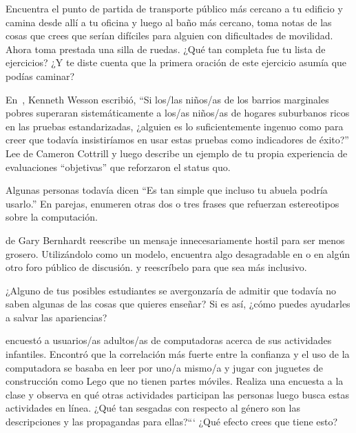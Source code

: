 
Encuentra el punto de partida de transporte público más cercano a tu edificio
y camina desde allí a tu oficina y luego al baño más cercano,
toma notas de las cosas que crees que serían difíciles para alguien con dificultades de movilidad.
Ahora toma prestada una silla de ruedas.
¿Qué tan completa fue tu lista de ejercicios?
¿Y te diste cuenta que la primera oración de este ejercicio asumía que podías caminar?


En~\cite{Litt2004},
Kenneth Wesson escribió,
``Si los/las niños/as de los barrios marginales pobres superaran sistemáticamente a los/as niños/as de hogares suburbanos ricos en las pruebas estandarizadas,
¿alguien es lo suficientemente ingenuo como para creer que todavía insistiríamos en usar estas pruebas como indicadores de éxito?''
Lee 
de Cameron Cottrill
y luego describe un ejemplo de tu propia experiencia de evaluaciones ``objetivas'' que reforzaron el status quo.


Algunas personas todavía dicen ``Es tan simple que incluso tu abuela podría usarlo.''
En parejas,
enumeren otras dos o tres frases que refuerzan estereotipos sobre la computación.


de Gary Bernhardt
reescribe un mensaje innecesariamente hostil para ser menos grosero.
Utilizándolo como un modelo,
encuentra algo desagradable en  o en algún otro foro público de discusión.
y reescríbelo para que sea más inclusivo.


¿Alguno de tus posibles estudiantes se avergonzaría de admitir que
todavía no saben algunas de las cosas que quieres enseñar?
Si es así,
¿cómo puedes ayudarles a salvar las apariencias?


\cite{Cutt2017} encuestó a usuarios/as adultos/as de computadoras acerca de sus actividades infantiles.
Encontró que la correlación más fuerte entre la confianza y el uso de la computadora
se basaba en leer por uno/a mismo/a y jugar con juguetes de construcción como Lego que no tienen partes móviles.
Realiza una encuesta a la clase y observa en qué otras actividades participan las personas
luego busca estas actividades en línea.
¿Qué tan sesgadas con respecto al género son las descripciones y las propagandas para ellas?```
¿Qué efecto crees que tiene esto?


